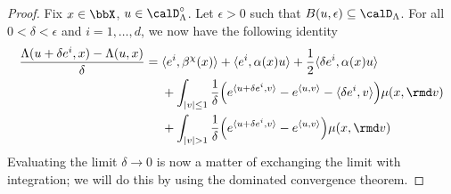 \begin{proof}
  \label{proof:lemma:ode-differentiable}
  Fix $\stateVar \in \stateSpace$, $\momentVar \in \odeSpace^\circ$.
  Let $\epsilon > 0$ such that $B(\momentVar, \epsilon) \subseteq \odeSpace$.
  For all $0 < \delta < \epsilon$ and $i = 1, \ldots, d$, we now have the following identity
  \begin{equation}
    \label{eq:difference-quotient}
    \frac{\ode(\momentVar+\delta \basisVec^i,\stateVar) - \ode(\momentVar,\stateVar)}{\delta}
    = \begin{aligned}[t]
      &\prj{\basisVec^i}{\affDrift^\trunc(\stateVar)} + \prj{\basisVec^i}{\affDiff(\stateVar)\momentVar} + \frac12\prj{\delta \basisVec^i}{\affDiff(\stateVar)\momentVar} \\
      &+ \int_{|\markVar|\leq 1} \frac1\delta\Big( e^\prj{\momentVar+\delta \basisVec^i}{\markVar} - e^\prj{\momentVar}{\markVar} - \prj{\delta \basisVec^i}{\markVar} \Big) \affJump(\stateVar,\rmd\markVar) \\
      &+ \int_{|\markVar| > 1}  \frac1\delta\Big( e^\prj{\momentVar+\delta \basisVec^i}{\markVar} - e^\prj{\momentVar}{\markVar} \Big) \affJump(\stateVar,\rmd\markVar) \\
    \end{aligned}
  \end{equation}
  Evaluating the limit $\delta \rightarrow 0$ is now a matter of exchanging the limit with integration; we will do this by using the dominated convergence theorem.


\end{proof}
